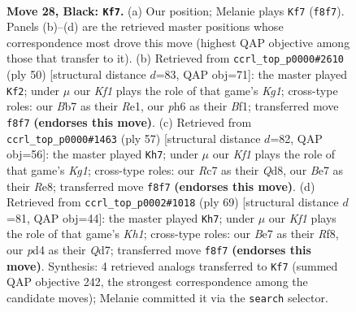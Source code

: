 \documentclass[11pt]{article}
\begin{document}
\clearpage

\begin{figure}[p]\centering
\begin{subfigure}{0.46\textwidth}\centering
\resizebox{\linewidth}{!}{%
\newchessgame
\chessboard[
  setfen={r4k2/pbrqb2p/n5pP/1p1p1pP1/3P1P2/1P2P1N1/8/R2QKBNR b KQ - 3 28},
  showmover=false,
  pgfstyle=straightmove, color=movearrow, markmove={f8-f7}
]}
\caption{}
\end{subfigure}\hfill
\begin{subfigure}{0.46\textwidth}\centering
\resizebox{\linewidth}{!}{%
\newchessgame
\chessboard[
  setfen={r5k1/3qrpp1/bp1p1n1p/p2p4/3P4/PP3PP1/3BP2P/2RQRBK1 w - - 6 26},
  showmover=false,
  pgfstyle=straightmove, color=movearrow, markmove={g1-f2}
]}
\caption{}
\end{subfigure}
\\[4pt]
\begin{subfigure}{0.46\textwidth}\centering
\resizebox{\linewidth}{!}{%
\newchessgame
\chessboard[
  setfen={3qr1k1/2bbn1p1/2pp3p/p4p2/P1PPp2P/B3P1P1/3N1PB1/1R1Q2K1 b - - 5 29},
  showmover=false,
  pgfstyle=straightmove, color=movearrow, markmove={g8-h7}
]}
\caption{}
\end{subfigure}\hfill
\begin{subfigure}{0.46\textwidth}\centering
\resizebox{\linewidth}{!}{%
\newchessgame
\chessboard[
  setfen={1r3r1k/1b1qnpp1/3p1b1p/Rpp1p2P/4P3/1BPPNNP1/1P3P2/R2Q2K1 b - - 2 35},
  showmover=false,
  pgfstyle=straightmove, color=movearrow, markmove={h8-h7}
]}
\caption{}
\end{subfigure}
\caption{\textbf{Move 28, Black: \texttt{Kf7}.} (a) Our position; Melanie plays \texttt{Kf7} (\texttt{f8f7}). Panels (b)--(d) are the retrieved master positions whose correspondence most drove this move (highest QAP objective among those that transfer to it). (b) Retrieved from \texttt{ccrl\_top\_p0000\#2610} (ply 50) [structural distance $d$=83, QAP obj=71]: the master played \texttt{Kf2}; under $\mu$ our \emph{Kf1} plays the role of that game's \emph{Kg1}; cross-type roles: our \emph{B}b7 as their \emph{R}e1, our \emph{p}h6 as their \emph{B}f1; transferred move \texttt{f8f7} \textbf{(endorses this move)}. (c) Retrieved from \texttt{ccrl\_top\_p0000\#1463} (ply 57) [structural distance $d$=82, QAP obj=56]: the master played \texttt{Kh7}; under $\mu$ our \emph{Kf1} plays the role of that game's \emph{Kg1}; cross-type roles: our \emph{R}c7 as their \emph{Q}d8, our \emph{B}e7 as their \emph{R}e8; transferred move \texttt{f8f7} \textbf{(endorses this move)}. (d) Retrieved from \texttt{ccrl\_top\_p0002\#1018} (ply 69) [structural distance $d$=81, QAP obj=44]: the master played \texttt{Kh7}; under $\mu$ our \emph{Kf1} plays the role of that game's \emph{Kh1}; cross-type roles: our \emph{B}e7 as their \emph{R}f8, our \emph{p}d4 as their \emph{Q}d7; transferred move \texttt{f8f7} \textbf{(endorses this move)}. Synthesis: 4 retrieved analogs transferred to \texttt{Kf7} (summed QAP objective 242, the strongest correspondence among the candidate moves); Melanie committed it via the \texttt{search} selector.}
\label{fig:thought-m55}
\end{figure}
\end{document}

